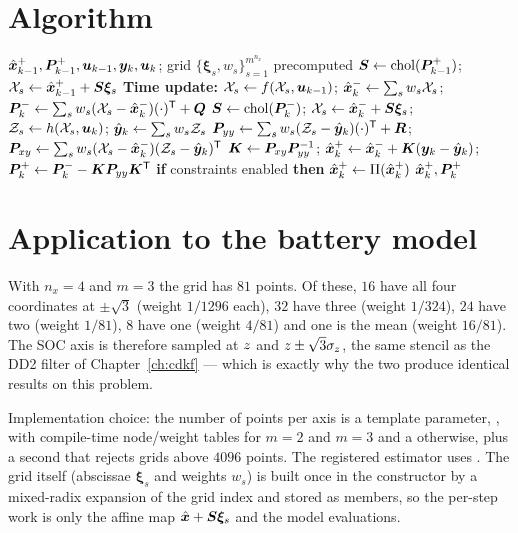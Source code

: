 \section{Algorithm}
\begin{algorithm}[H]
\caption{GHKF --- one sampling period (additive noise)}
\begin{algorithmic}[1]
\Require $\hat{\bm{x}}^{+}_{k-1},\bm{P}^{+}_{k-1},\bm{u}_{k-1},\bm{y}_k,\bm{u}_k$; grid $\{\bm{\xi}_s,w_s\}_{s=1}^{m^{n_x}}$ precomputed
\State $\bm{S}\gets\operatorname{chol}(\bm{P}^{+}_{k-1})$;\; $\mathcal{X}_s\gets\hat{\bm{x}}^{+}_{k-1}+\bm{S}\bm{\xi}_s$
\State \textbf{Time update:} $\mathcal{X}_s\gets f(\mathcal{X}_s,\bm{u}_{k-1})$;\;
       $\hat{\bm{x}}^{-}_k\gets\sum_s w_s\mathcal{X}_s$;\;
       $\bm{P}^{-}_k\gets\sum_s w_s(\mathcal{X}_s-\hat{\bm{x}}^{-}_k)(\cdot)^{\mathsf{T}}+\bm{Q}$
\State $\bm{S}\gets\operatorname{chol}(\bm{P}^{-}_k)$;\; $\mathcal{X}_s\gets\hat{\bm{x}}^{-}_k+\bm{S}\bm{\xi}_s$;\;
       $\mathcal{Z}_s\gets h(\mathcal{X}_s,\bm{u}_k)$;\; $\hat{\bm{y}}_k\gets\sum_s w_s\mathcal{Z}_s$
\State $\bm{P}_{yy}\gets\sum_s w_s(\mathcal{Z}_s-\hat{\bm{y}}_k)(\cdot)^{\mathsf{T}}+\bm{R}$;\;
       $\bm{P}_{xy}\gets\sum_s w_s(\mathcal{X}_s-\hat{\bm{x}}^{-}_k)(\mathcal{Z}_s-\hat{\bm{y}}_k)^{\mathsf{T}}$
\State $\bm{K}\gets\bm{P}_{xy}\bm{P}_{yy}^{-1}$;\; $\hat{\bm{x}}^{+}_k\gets\hat{\bm{x}}^{-}_k+\bm{K}(\bm{y}_k-\hat{\bm{y}}_k)$;\;
       $\bm{P}^{+}_k\gets\bm{P}^{-}_k-\bm{K}\bm{P}_{yy}\bm{K}^{\mathsf{T}}$
\State \textbf{if} constraints enabled \textbf{then} $\hat{\bm{x}}^{+}_k\gets\Pi(\hat{\bm{x}}^{+}_k)$
\Ensure $\hat{\bm{x}}^{+}_k,\bm{P}^{+}_k$
\end{algorithmic}
\end{algorithm}

\section{Application to the battery model}
With $n_x=4$ and $m=3$ the grid has $81$ points. Of these, $16$ have all four coordinates at
$\pm\sqrt3$ (weight $1/1296$ each), $32$ have three (weight $1/324$), $24$ have two
(weight $1/81$), $8$ have one (weight $4/81$) and one is the mean (weight $16/81$). The
SOC axis is therefore sampled at $z$ and $z\pm\sqrt3\sigma_z$, the same stencil as
the DD2 filter of Chapter~\ref{ch:cdkf} --- which is exactly why the two produce identical
results on this problem.

Implementation choice: the number of points per axis is a template parameter,
, with compile-time node/weight tables for $m=2$ and $m=3$ and a
 otherwise, plus a second  that rejects grids above
$4096$ points. The registered estimator uses . The grid itself
(abscissae $\bm{\xi}_s$ and weights $w_s$) is built once in the constructor by a mixed-radix
expansion of the grid index and stored as members, so the per-step work is only the affine map
$\hat{\bm{x}} + \bm{S}\bm{\xi}_s$ and the model evaluations.


